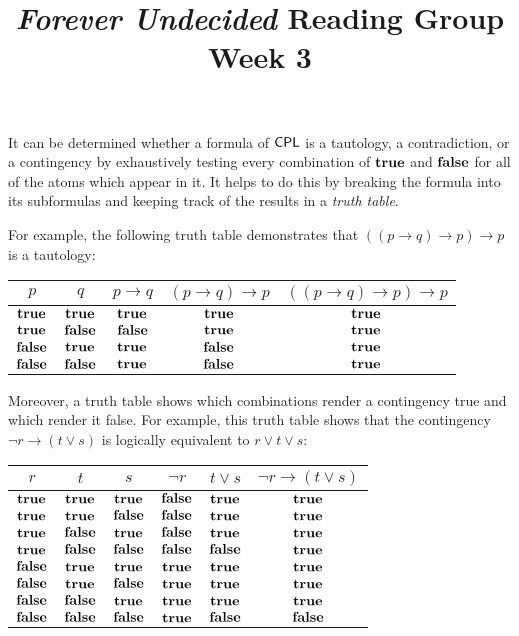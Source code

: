\documentclass{article}
\title{\emph{Forever Undecided} Reading Group \\ Week 3}
\date{}
\author{}
\begin{document}
\maketitle

It can be determined whether a formula of $\mathsf{CPL}$ is a tautology, a contradiction, or a contingency by exhaustively testing every combination of $\mathbf{true}$ and $\mathbf{false}$ for all of the atoms which appear in it. It helps to do this by breaking the formula into its subformulas and keeping track of the results in a \emph{truth table}.

For example, the following truth table demonstrates that $((p \to q) \to p) \to p$ is a tautology:

\begin{center}
\begin{tabular}{c|c||c|c|c}
    $p$ & $q$ & $p \to q$ & $(p \to q) \to p$ & $((p \to q) \to p) \to p$ \\
    \hline
    $\mathbf{true}$  & $\mathbf{true}$  & $\mathbf{true}$  & $\mathbf{true}$  & $\mathbf{true}$ \\
    $\mathbf{true}$  & $\mathbf{false}$ & $\mathbf{false}$ & $\mathbf{true}$  & $\mathbf{true}$ \\
    $\mathbf{false}$ & $\mathbf{true}$  & $\mathbf{true}$  & $\mathbf{false}$ & $\mathbf{true}$ \\
    $\mathbf{false}$ & $\mathbf{false}$ & $\mathbf{true}$  & $\mathbf{false}$ & $\mathbf{true}$ \\
\end{tabular}
\end{center}

Moreover, a truth table shows which combinations render a contingency true and which render it false. For example, this truth table shows that the contingency $\neg r \to (t \vee s)$ is logically equivalent to $r \vee t \vee s$:

\begin{center}
\begin{tabular}{c|c|c||c|c|c}
    $r$ & $t$ & $s$ & $\neg r$ & $t \vee s$ & $\neg r \to (t \vee s)$ \\
    \hline
    $\mathbf{true}$  & $\mathbf{true}$  & $\mathbf{true}$  & $\mathbf{false}$ & $\mathbf{true}$  & $\mathbf{true}$  \\
    $\mathbf{true}$  & $\mathbf{true}$  & $\mathbf{false}$ & $\mathbf{false}$ & $\mathbf{true}$  & $\mathbf{true}$  \\
    $\mathbf{true}$  & $\mathbf{false}$ & $\mathbf{true}$  & $\mathbf{false}$ & $\mathbf{true}$  & $\mathbf{true}$  \\
    $\mathbf{true}$  & $\mathbf{false}$ & $\mathbf{false}$ & $\mathbf{false}$ & $\mathbf{false}$ & $\mathbf{true}$  \\
    $\mathbf{false}$ & $\mathbf{true}$  & $\mathbf{true}$  & $\mathbf{true}$  & $\mathbf{true}$  & $\mathbf{true}$  \\
    $\mathbf{false}$ & $\mathbf{true}$  & $\mathbf{false}$ & $\mathbf{true}$  & $\mathbf{true}$  & $\mathbf{true}$  \\
    $\mathbf{false}$ & $\mathbf{false}$ & $\mathbf{true}$  & $\mathbf{true}$  & $\mathbf{true}$  & $\mathbf{true}$  \\
    $\mathbf{false}$ & $\mathbf{false}$ & $\mathbf{false}$ & $\mathbf{true}$  & $\mathbf{false}$ & $\mathbf{false}$ \\
\end{tabular}
\end{center}
\end{document}
